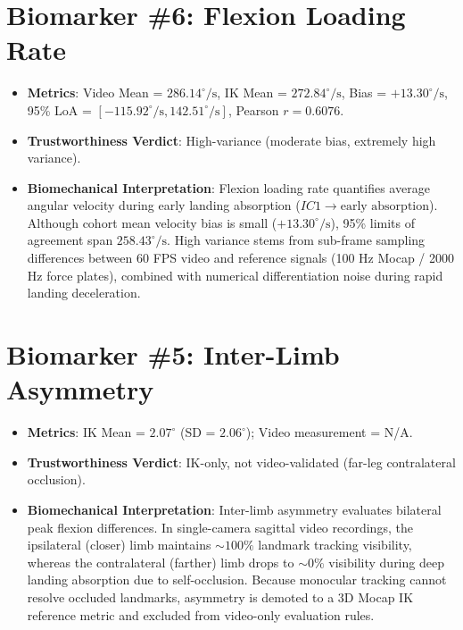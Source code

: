 \section{Biomarker \protect\#6: Flexion Loading Rate}
\label{sec:d-4-biomarker-protect-6-flexion-loading-rate}

\begin{itemize}
  \item \textbf{Metrics}: Video Mean = $286.14^\circ/\text{s}$, IK Mean = $272.84^\circ/\text{s}$, Bias = $+13.30^\circ/\text{s}$, 95\% LoA = $[-115.92^\circ/\text{s}, 142.51^\circ/\text{s}]$, Pearson $r = 0.6076$.
  \item \textbf{Trustworthiness Verdict}: High-variance (moderate bias, extremely high variance).
  \item \textbf{Biomechanical Interpretation}: Flexion loading rate quantifies average angular velocity during early landing absorption ($IC1 \rightarrow \text{early absorption}$). Although cohort mean velocity bias is small ($+13.30^\circ/\text{s}$), 95\% limits of agreement span $258.43^\circ/\text{s}$. High variance stems from sub-frame sampling differences between 60 FPS video and reference signals (100 Hz Mocap / 2000 Hz force plates), combined with numerical differentiation noise during rapid landing deceleration.
\end{itemize}



\section{Biomarker \protect\#5: Inter-Limb Asymmetry}
\label{sec:d-5-biomarker-protect-5-inter-limb-asymmetry}

\begin{itemize}
  \item \textbf{Metrics}: IK Mean = $2.07^\circ$ (SD = $2.06^\circ$); Video measurement = N/A.
  \item \textbf{Trustworthiness Verdict}: IK-only, not video-validated (far-leg contralateral occlusion).
  \item \textbf{Biomechanical Interpretation}: Inter-limb asymmetry evaluates bilateral peak flexion differences. In single-camera sagittal video recordings, the ipsilateral (closer) limb maintains $\sim 100\%$ landmark tracking visibility, whereas the contralateral (farther) limb drops to $\sim 0\%$ visibility during deep landing absorption due to self-occlusion. Because monocular tracking cannot resolve occluded landmarks, asymmetry is demoted to a 3D Mocap IK reference metric and excluded from video-only evaluation rules.
\end{itemize}